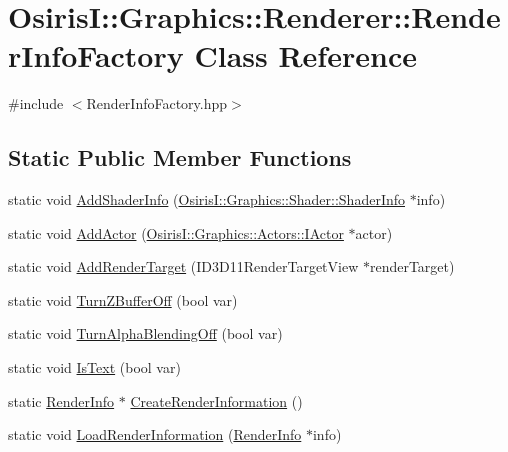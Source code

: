 \hypertarget{class_osiris_i_1_1_graphics_1_1_renderer_1_1_render_info_factory}{\section{Osiris\-I\-:\-:Graphics\-:\-:Renderer\-:\-:Render\-Info\-Factory Class Reference}
\label{class_osiris_i_1_1_graphics_1_1_renderer_1_1_render_info_factory}
}


{\ttfamily \#include $<$Render\-Info\-Factory.\-hpp$>$}

\subsection*{Static Public Member Functions}
\begin{DoxyCompactItemize}
\item 
static void \hyperlink{class_osiris_i_1_1_graphics_1_1_renderer_1_1_render_info_factory_a77bb507c8eb4e1cf2af4e8b4b75a9176}{Add\-Shader\-Info} (\hyperlink{struct_osiris_i_1_1_graphics_1_1_shader_1_1_shader_info}{Osiris\-I\-::\-Graphics\-::\-Shader\-::\-Shader\-Info} $\ast$info)
\item 
static void \hyperlink{class_osiris_i_1_1_graphics_1_1_renderer_1_1_render_info_factory_a02bb4481c64a68ed2be759e1ea6fa422}{Add\-Actor} (\hyperlink{class_osiris_i_1_1_graphics_1_1_actors_1_1_i_actor}{Osiris\-I\-::\-Graphics\-::\-Actors\-::\-I\-Actor} $\ast$actor)
\item 
static void \hyperlink{class_osiris_i_1_1_graphics_1_1_renderer_1_1_render_info_factory_a116460ecfce8f5dec162f22de2e9ea92}{Add\-Render\-Target} (I\-D3\-D11\-Render\-Target\-View $\ast$render\-Target)
\item 
static void \hyperlink{class_osiris_i_1_1_graphics_1_1_renderer_1_1_render_info_factory_ac2bc85d538a6cb73f8629229b77d5b14}{Turn\-Z\-Buffer\-Off} (bool var)
\item 
static void \hyperlink{class_osiris_i_1_1_graphics_1_1_renderer_1_1_render_info_factory_a2f2f412f8fe611888471ed3bfdd32517}{Turn\-Alpha\-Blending\-Off} (bool var)
\item 
static void \hyperlink{class_osiris_i_1_1_graphics_1_1_renderer_1_1_render_info_factory_a67e099532d76043d465aabc24ff66fd6}{Is\-Text} (bool var)
\item 
static \hyperlink{struct_osiris_i_1_1_graphics_1_1_renderer_1_1_render_info}{Render\-Info} $\ast$ \hyperlink{class_osiris_i_1_1_graphics_1_1_renderer_1_1_render_info_factory_a997cce374176f90e900af8f1c75b4722}{Create\-Render\-Information} ()
\item 
static void \hyperlink{class_osiris_i_1_1_graphics_1_1_renderer_1_1_render_info_factory_af9e3353e54c53475f2478785887d9f9c}{Load\-Render\-Information} (\hyperlink{struct_osiris_i_1_1_graphics_1_1_renderer_1_1_render_info}{Render\-Info} $\ast$info)
\end{DoxyCompactItemize}



